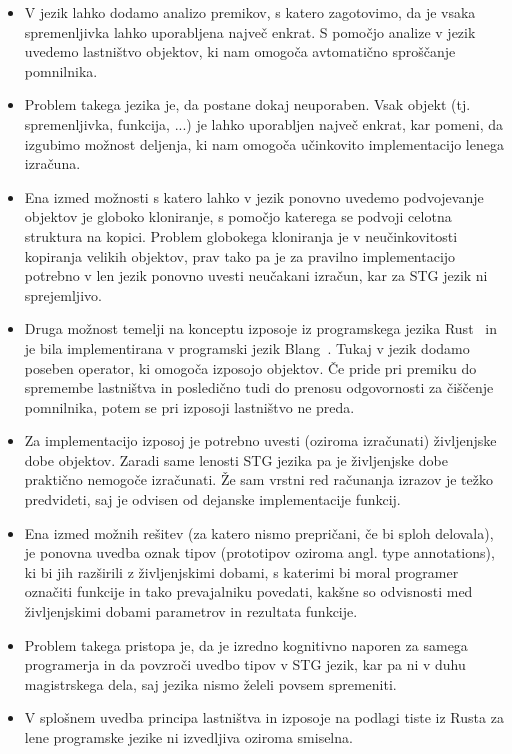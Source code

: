 \begin{itemize}
    \item V jezik lahko dodamo analizo premikov, s katero zagotovimo, da je vsaka spremenljivka lahko uporabljena največ enkrat. S pomočjo analize v jezik uvedemo lastništvo objektov, ki nam omogoča avtomatično sproščanje pomnilnika.
    \item Problem takega jezika je, da postane dokaj neuporaben. Vsak objekt (tj. spremenljivka, funkcija, ...) je lahko uporabljen največ enkrat, kar pomeni, da izgubimo možnost deljenja, ki nam omogoča učinkovito implementacijo lenega izračuna.
    \item Ena izmed možnosti s katero lahko v jezik ponovno uvedemo podvojevanje objektov je globoko kloniranje, s pomočjo katerega se podvoji celotna struktura na kopici. Problem globokega kloniranja je v neučinkovitosti kopiranja velikih objektov, prav tako pa je za pravilno implementacijo potrebno v len jezik ponovno uvesti neučakani izračun, kar za STG jezik ni sprejemljivo.
    \item Druga možnost temelji na konceptu izposoje iz programskega jezika Rust~\cite{klabnik2023rust} in je bila implementirana v programski jezik Blang~\cite{turk2022len}. Tukaj v jezik dodamo poseben operator, ki omogoča izposojo objektov. Če pride pri premiku do spremembe lastništva in posledično tudi do prenosu odgovornosti za čiščenje pomnilnika, potem se pri izposoji lastništvo ne preda.
    \item Za implementacijo izposoj je potrebno uvesti (oziroma izračunati) življenjske dobe objektov. Zaradi same lenosti STG jezika pa je življenjske dobe praktično nemogoče izračunati. Že sam vrstni red računanja izrazov je težko predvideti, saj je odvisen od dejanske implementacije funkcij.
    \item Ena izmed možnih rešitev (za katero nismo prepričani, če bi sploh delovala), je ponovna uvedba oznak tipov (prototipov oziroma angl. type annotations), ki bi jih razširili z življenjskimi dobami, s katerimi bi moral programer označiti funkcije in tako prevajalniku povedati, kakšne so odvisnosti med življenjskimi dobami parametrov in rezultata funkcije.
    \item Problem takega pristopa je, da je izredno kognitivno naporen za samega programerja in da povzroči uvedbo tipov v STG jezik, kar pa ni v duhu magistrskega dela, saj jezika nismo želeli povsem spremeniti.
    \item V splošnem uvedba principa lastništva in izposoje na podlagi tiste iz Rusta za lene programske jezike ni izvedljiva oziroma smiselna.
\end{itemize}

